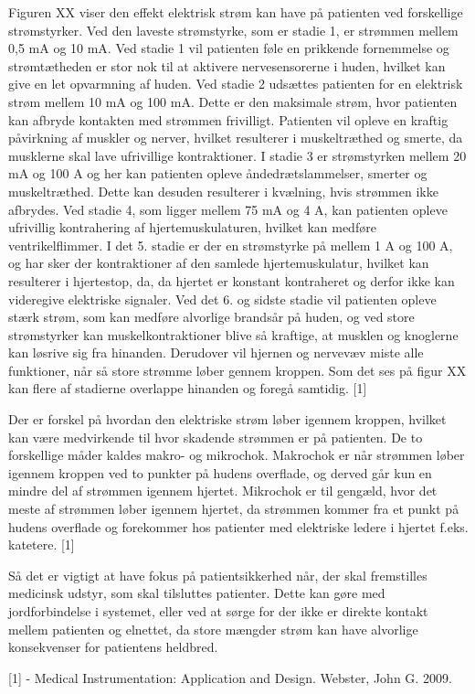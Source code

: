Figuren XX viser den effekt elektrisk strøm kan have på patienten ved forskellige strømstyrker. Ved den laveste strømstyrke, som er stadie 1, er strømmen mellem 0,5 mA og 10 mA. Ved stadie 1 vil patienten føle en prikkende fornemmelse og strømtætheden er stor nok til at aktivere nervesensorerne i huden, hvilket kan give en let opvarmning af huden. Ved stadie 2 udsættes patienten for en elektrisk strøm mellem 10 mA og 100 mA. Dette er den maksimale strøm, hvor patienten kan afbryde kontakten med strømmen frivilligt. Patienten vil opleve en kraftig påvirkning af muskler og nerver, hvilket resulterer i muskeltræthed og smerte, da musklerne skal lave ufrivillige kontraktioner. I stadie 3 er strømstyrken mellem 20 mA og 100 A og her kan patienten opleve åndedrætslammelser, smerter og muskeltræthed. Dette kan desuden resulterer i kvælning, hvis strømmen ikke afbrydes. Ved stadie 4, som ligger mellem 75 mA og 4 A, kan patienten opleve ufrivillig kontrahering af hjertemuskulaturen, hvilket kan medføre ventrikelflimmer. I det 5. stadie er der en strømstyrke på mellem 1 A og 100 A, og har sker der kontraktioner af den samlede hjertemuskulatur, hvilket kan resulterer i hjertestop, da, da hjertet er konstant kontraheret og derfor ikke kan videregive elektriske signaler. Ved det 6. og sidste stadie vil patienten opleve stærk strøm, som kan medføre alvorlige brandsår på huden, og ved store strømstyrker kan muskelkontraktioner blive så kraftige, at musklen og knoglerne kan løsrive sig fra hinanden. Derudover vil hjernen og nervevæv miste alle funktioner, når så store strømme løber gennem kroppen. Som det ses på figur XX kan flere af stadierne overlappe hinanden og foregå samtidig. [1]

Der er forskel på hvordan den elektriske strøm løber igennem kroppen, hvilket kan være medvirkende til hvor skadende strømmen er på patienten. De to forskellige måder kaldes makro- og mikrochok. Makrochok er når strømmen løber igennem kroppen ved to punkter på hudens overflade, og derved går kun en mindre del af strømmen igennem hjertet. Mikrochok er til gengæld, hvor det meste af strømmen løber igennem hjertet, da strømmen kommer fra et punkt på hudens overflade og forekommer hos patienter med elektriske ledere i hjertet f.eks. katetere. [1]

Så det er vigtigt at have fokus på patientsikkerhed når, der skal fremstilles medicinsk udstyr, som skal tilsluttes patienter. Dette kan gøre med jordforbindelse i systemet, eller ved at sørge for der ikke er direkte kontakt mellem patienten og elnettet, da store mængder strøm kan have alvorlige konsekvenser for patientens heldbred. 


[1] - Medical Instrumentation: Application and Design. Webster, John G. 2009.